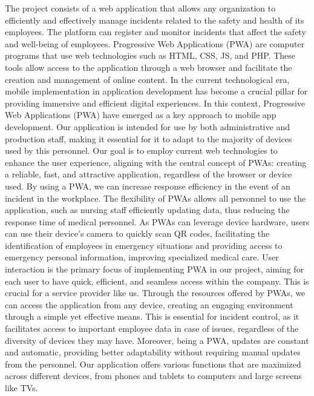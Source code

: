\documentclass{report}
\begin{document}
The project consists of a web application that allows any organization to efficiently and effectively manage incidents related to the safety and health of its employees. The platform can register and monitor incidents that affect the safety and well-being of employees.
\vspace{0.5cm}
Progressive Web Applications (PWA) are computer programs that use web technologies such as HTML, CSS, JS, and PHP. These tools allow access to the application through a web browser and facilitate the creation and management of online content.
\vspace{0.5cm}
In the current technological era, mobile implementation in application development has become a crucial pillar for providing immersive and efficient digital experiences. In this context, Progressive Web Applications (PWA) have emerged as a key approach to mobile app development.
\vspace{0.5cm}
Our application is intended for use by both administrative and production staff, making it essential for it to adapt to the majority of devices used by this personnel.
\vspace{0.5cm}
Our goal is to employ current web technologies to enhance the user experience, aligning with the central concept of PWAs: creating a reliable, fast, and attractive application, regardless of the browser or device used.
\vspace{0.5cm}
By using a PWA, we can increase response efficiency in the event of an incident in the workplace. The flexibility of PWAs allows all personnel to use the application, such as nursing staff efficiently updating data, thus reducing the response time of medical personnel.
\vspace{0.5cm}
As PWAs can leverage device hardware, users can use their device's camera to quickly scan QR codes, facilitating the identification of employees in emergency situations and providing access to emergency personal information, improving specialized medical care.
\vspace{0.5cm}
User interaction is the primary focus of implementing PWA in our project, aiming for each user to have quick, efficient, and seamless access within the company. This is crucial for a service provider like us.
\vspace{0.5cm}
Through the resources offered by PWAs, we can access the application from any device, creating an engaging environment through a simple yet effective means. This is essential for incident control, as it facilitates access to important employee data in case of issues, regardless of the diversity of devices they may have.
\vspace{0.5cm}
Moreover, being a PWA, updates are constant and automatic, providing better adaptability without requiring manual updates from the personnel.
\vspace{0.5cm}
Our application offers various functions that are maximized across different devices, from phones and tablets to computers and large screens like TVs.
\vspace{0.5cm}
\end{document}

